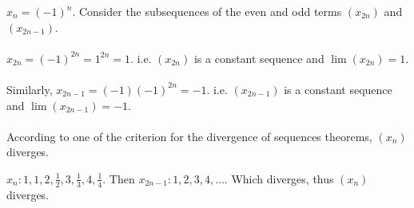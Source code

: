 \documentclass[class=scrartcl, crop=false]{standalone}
\begin{document}
\begin{example}
  $x_n = (-1)^n$. Consider the subsequences of the even and odd terms $(x_{2n})$ and $(x_{2n - 1})$.
  \\\\
  $x_{2n} = (-1)^{2n} = 1^{2n} = 1$. i.e. $(x_{2n})$ is a constant sequence and $\lim(x_{2n}) = 1$.
  \\\\
  Similarly, $x_{2n - 1} = (-1)(-1)^{2n} = -1$. i.e. $(x_{2n - 1})$ is a constant sequence and $\lim(x_{2n - 1}) = -1$.
  \\\\
  According to one of the criterion for the divergence of sequences theorems, $(x_n)$ diverges. 
\end{example}

\begin{example}
  $x_n: 1, 1, 2, \frac{1}{2}, 3, \frac{1}{3}, 4, \frac{1}{4}$.
  Then $x_{2n - 1}: 1, 2, 3, 4, \dots$. Which diverges, thus $(x_n)$ diverges.
\end{example}
\end{document}
